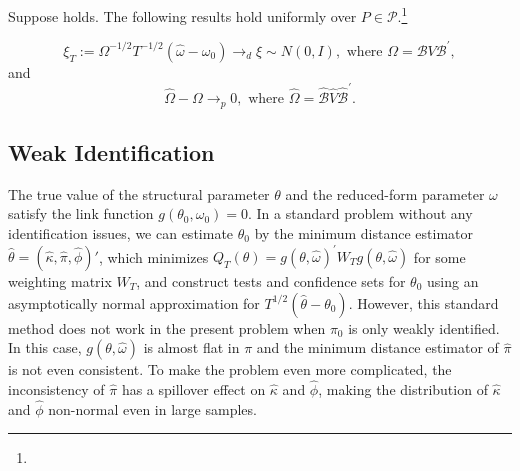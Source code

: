 \begin{lemma}
\label{Lemma Reduce}
Suppose  holds. The following results hold uniformly over $P\in \mathcal{P}$.\footnote{}

    \begin{equation*} 
        \xi _{T}:=\Omega ^{-1/2}T^{-1/2}(\widehat{\omega } -\omega _{0})\rightarrow _{d}\xi \sim N(0,I), \text{  where } \Omega =\mathcal{B}V \mathcal{B}^{\prime }, 
    \end{equation*} 
%
    and 
%
    \begin{equation*}
        \widehat{\Omega }-\Omega \rightarrow_{p}0, \text{ where } \widehat{\Omega }=\widehat{\mathcal{B}}\widehat{V}\widehat{\mathcal{B}}^{\prime}.
    \end{equation*}
\end{lemma}

\subsection{Weak Identification}

The true value of the structural parameter $\theta$ and the reduced-form parameter $\omega$ satisfy the link function $g(\theta_{0},\omega _{0})=0$. In a standard problem without any identification issues, we can estimate $\theta _{0}$ by the minimum distance estimator $\widehat{\theta} =(\widehat{\kappa },\widehat{\pi },\widehat{\phi})'$, which minimizes $ Q_{T}(\theta )=g(\theta ,\widehat{\omega })^{\prime }W_{T}g(\theta , \widehat{\omega })$ for some weighting matrix $W_{T}$, and construct tests and confidence sets for $\theta _{0}$ using an asymptotically normal approximation for $T^{1/2}(\widehat{\theta }-\theta _{0})$. However, this standard method does not work in the present problem when $\pi _{0}$ is only weakly identified. In this case, $g(\theta ,\widehat{\omega })$ is almost flat in $\pi $ and the minimum distance estimator of $\widehat{\pi }$ is not even consistent. To make the problem even more complicated, the inconsistency of $\widehat{\pi }$ has a spillover effect on $\widehat{\kappa }$ and $\widehat{\phi}$, making the distribution of $\widehat{\kappa }$ and $\widehat{\phi }$ non-normal even in large samples.

